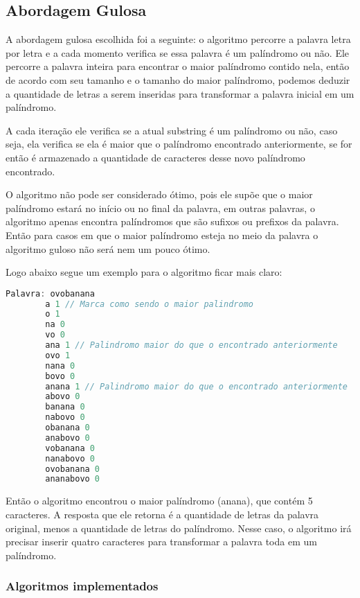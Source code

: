 \documentclass[12pt]{article}
\begin{document}
\subsection{Abordagem Gulosa}
\label{gulosa}

A abordagem gulosa escolhida foi a seguinte: o algoritmo percorre a palavra letra por letra e a cada momento verifica se essa palavra é um palíndromo ou não. Ele percorre a palavra inteira para encontrar o maior palíndromo contido nela, então de acordo com seu tamanho e o tamanho do maior palíndromo, podemos deduzir a quantidade de letras a serem inseridas para transformar a palavra inicial em um palíndromo.

A cada iteração ele verifica se a atual substring é um palíndromo ou não, caso seja, ela verifica se ela é maior que o palíndromo encontrado anteriormente, se for então é armazenado a quantidade de caracteres desse novo palíndromo encontrado.

O algoritmo não pode ser considerado ótimo, pois ele supõe que o maior palíndromo estará no início ou no final da palavra, em outras palavras, o algoritmo apenas encontra palíndromos que são sufixos ou prefixos da palavra. Então para casos em que o maior palíndromo esteja no meio da palavra o algoritmo guloso não será nem um pouco ótimo.

Logo abaixo segue um exemplo para o algoritmo ficar mais claro:

    \begin{lstlisting}[language=c]
        Palavra: ovobanana
        a 1 // Marca como sendo o maior palindromo
        o 1
        na 0
        vo 0
        ana 1 // Palindromo maior do que o encontrado anteriormente
        ovo 1
        nana 0
        bovo 0
        anana 1 // Palindromo maior do que o encontrado anteriormente
        abovo 0
        banana 0
        nabovo 0
        obanana 0
        anabovo 0
        vobanana 0
        nanabovo 0
        ovobanana 0
        ananabovo 0
    \end{lstlisting}

    Então o algoritmo encontrou o maior palíndromo (anana), que contém 5 caracteres. A resposta que ele retorna é a quantidade de letras da palavra original, menos a quantidade de letras do palíndromo. Nesse caso, o algoritmo irá precisar inserir quatro caracteres para transformar a palavra toda em um palíndromo.

\subsubsection{Algoritmos implementados}
\end{document}
